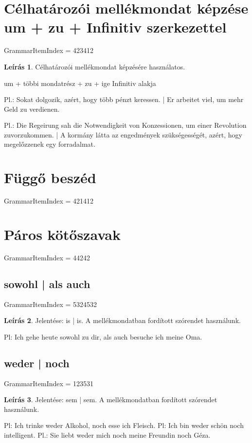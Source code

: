 \documentclass{article}
\theoremstyle{definition}
\newtheorem*{desc}{Leírás}
\begin{document}
\section{Célhatározói mellékmondat képzése um + zu + Infinitiv szerkezettel}

GrammarItemIndex = 423412

\begin{desc}
Célhatározói mellékmondat képzésére használatos.

um + többi mondatrész + zu + ige Infinitiv alakja

Pl.: Sokat dolgozik, azért, hogy több pénzt keressen. | Er arbeitet viel, um mehr Geld zu verdienen.

Pl.: Die Regeirung sah die Notwendigkeit von Konzessionen, um einer Revolution zuvorzukommen. | A kormány látta az engedmények szükségességét, azért, hogy megelőzzenek egy forradalmat.
\end{desc}

\section{Függő beszéd}

GrammarItemIndex = 421412

\section{Páros kötőszavak}

GrammarItemIndex = 44242

\subsection{sowohl | als auch}

GrammarItemIndex = 5324532

\begin{desc}
Jelentése: is | is. A mellékmondatban fordított szórendet használunk.

Pl: Ich gehe heute sowohl zu dir, als auch besuche ich meine Oma. 
\end{desc}

\subsection{weder | noch}

GrammarItemIndex = 123531

\begin{desc}
Jelentése: sem | sem. A mellékmondatban fordított szórendet használunk.

Pl: Ich trinke weder Alkohol, noch esse ich Fleisch.
Pl: Ich bin weder schön noch intelligent.
Pl.: Sie liebt weder mich noch meine Freundin noch Géza.
\end{desc}
\end{document}
